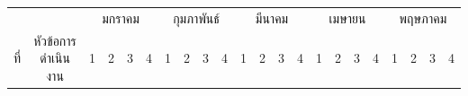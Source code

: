 \documentclass[12pt,oneside,openright,a4paper]{cpe-thai-project}
\begin{document}
\begin{table}[h]
{\begin{tabular}{|llllllllllllllllllllll|}
\multicolumn{1}{|c|}{}                      & \multicolumn{1}{c|}{}                                                                     & \multicolumn{4}{c|}{มกราคม}                                                                                                                                                                   & \multicolumn{4}{c|}{กุมภาพันธ์}                                                                                                                                                               & \multicolumn{4}{c|}{มีนาคม}                                                                                                                                                                   & \multicolumn{4}{c|}{เมษายน}                                                                                                                                                                   & \multicolumn{4}{c|}{พฤษภาคม}                                                                                                                                                                                                                                         \\ \cline{3-22} 
\multicolumn{1}{|c|}{\multirow{-3}{*}{ที่}} & \multicolumn{1}{c|}{\multirow{-3}{*}{หัวข้อการดำเนินงาน}}                                 & \multicolumn{1}{c|}{1}                        & \multicolumn{1}{c|}{2}                        & \multicolumn{1}{c|}{3}                        & \multicolumn{1}{c|}{4}                        & \multicolumn{1}{c|}{1}                        & \multicolumn{1}{c|}{2}                        & \multicolumn{1}{c|}{3}                        & \multicolumn{1}{c|}{4}                        & \multicolumn{1}{c|}{1}                        & \multicolumn{1}{c|}{2}                        & \multicolumn{1}{c|}{3}                        & \multicolumn{1}{c|}{4}                        & \multicolumn{1}{c|}{1}                        & \multicolumn{1}{c|}{2}                        & \multicolumn{1}{c|}{3}                        & \multicolumn{1}{c|}{4}                        & \multicolumn{1}{l|}{1}                                               & \multicolumn{1}{l|}{2}                                               & \multicolumn{1}{l|}{3}                                               & 4                                               \\ \hline

\end{tabular}}
\end{table}
\end{document}

